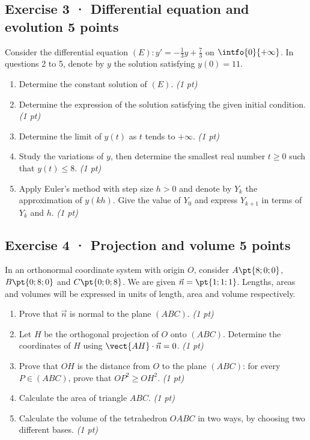 \mxnewpage{}

\subsection*{Exercise 3 · Differential equation and evolution \hfill 5 points}Consider the differential equation $(E):y'=-\frac1{3}y+\frac{7}{3}$ on $\intfo{0}{+\infty}$. In questions 2 to 5, denote by $y$ the solution satisfying $y(0)=11$.

\begin{enumerate}

\item Determine the constant solution of $(E)$. \hfill\textit{(1 pt)}

\item Determine the expression of the solution satisfying the given initial condition. \hfill\textit{(1 pt)}

\item Determine the limit of $y(t)$ as $t$ tends to $+\infty$. \hfill\textit{(1 pt)}

\item Study the variations of $y$, then determine the smallest real number $t\ge0$ such that $y(t)\le8$. \hfill\textit{(1 pt)}

\item Apply Euler's method with step size $h>0$ and denote by $Y_k$ the approximation of $y(kh)$. Give the value of $Y_0$ and express $Y_{k+1}$ in terms of $Y_k$ and $h$. \hfill\textit{(1 pt)}

\end{enumerate}

\subsection*{Exercise 4 · Projection and volume \hfill 5 points}In an orthonormal coordinate system with origin $O$, consider $A\pt{8;0;0}$, $B\pt{0;8;0}$ and $C\pt{0;0;8}$. We are given $\vec n=\pt{1;1;1}$. Lengths, areas and volumes will be expressed in units of length, area and volume respectively.

\begin{enumerate}

\item Prove that $\vec n$ is normal to the plane $(ABC)$. \hfill\textit{(1 pt)}

\item Let $H$ be the orthogonal projection of $O$ onto $(ABC)$. Determine the coordinates of $H$ using $\vect{AH}\cdot\vec n=0$. \hfill\textit{(1 pt)}

\item Prove that $OH$ is the distance from $O$ to the plane $(ABC)$: for every $P\in(ABC)$, prove that $OP^2\ge OH^2$. \hfill\textit{(1 pt)}

\item Calculate the area of triangle $ABC$. \hfill\textit{(1 pt)}

\item Calculate the volume of the tetrahedron $OABC$ in two ways, by choosing two different bases. \hfill\textit{(1 pt)}

\end{enumerate}

